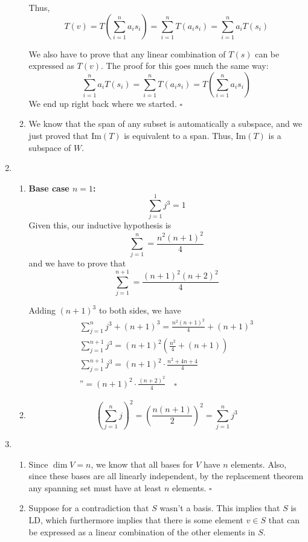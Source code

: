 \documentclass[12pt]{article}
\begin{document}
\begin{enumerate}
\begin{enumerate}
                        Thus, \[T(v)=T\left(\sum_{i=1}^n a_i s_i\right)=\sum_{i=1}^n T(a_i s_i)=\sum_{i=1}^n a_i T(s_i)\]

                        We also have to prove that any linear combination of $T(s)$ can be expressed as $T(v)$.
                        The proof for this goes much the same way:
                        \[\sum_{i=1}^n a_i T(s_i)=\sum_{i=1}^n T(a_i s_i)=T\left(\sum_{i=1}^n a_i s_i\right)\]
                        We end up right back where we started. $\square$
                  \item We know that the span of any subset is automatically a subspace, and we just proved that $\text{Im}(T)$ is equivalent to a span.
                        Thus, $\text{Im}(T)$ is a subspace of $W$.
            \end{enumerate}
      \item \begin{enumerate}
                  \item \textbf{Base case $n=1$:} \[\sum_{j=1}^1 j^3=1\]
                        Given this, our inductive hypothesis is \[\sum_{j=1}^n=\frac{n^2(n+1)^2}{4}\]
                        and we have to prove that \[\sum_{j=1}^{n+1}=\frac{(n+1)^2(n+2)^2}{4}\]

                        Adding $(n+1)^3$ to both sides, we have \begin{gather*}
                              \sum_{j=1}^n j^3+(n+1)^3 =\frac{n^2(n+1)^2}{4}+(n+1)^3 \\
                              \sum_{j=1}^{n+1} j^3=(n+1)^2\left(\frac{n^2}{4}+(n+1)\right) \\
                              \sum_{j=1}^{n+1} j^3=(n+1)^2 \cdot \frac{n^2+4n+4}{4} \\
                              \text{''}=(n+1)^2 \cdot \frac{(n+2)^2}{4}\quad\square
                        \end{gather*}
                  \item \[\left(\sum_{j=1}^n j\right)^2=\left(\frac{n(n+1)}{2}\right)^2=\sum_{j=1}^{n} j^3\]
            \end{enumerate}
      \item \begin{enumerate}
                  \item Since $\dim V=n$, we know that all bases for $V$ have $n$ elements.
                        Also, since these bases are all linearly independent, by the replacement theorem
                        any spanning set must have at least $n$ elements. $\square$
                  \item Suppose for a contradiction that $S$ wasn't a basis.
                        This implies that $S$ is LD, which furthermore implies that there is some element $v \in S$
                        that can be expressed as a linear combination of the other elements in $S$.


\end{enumerate}
\end{enumerate}
\end{document}
